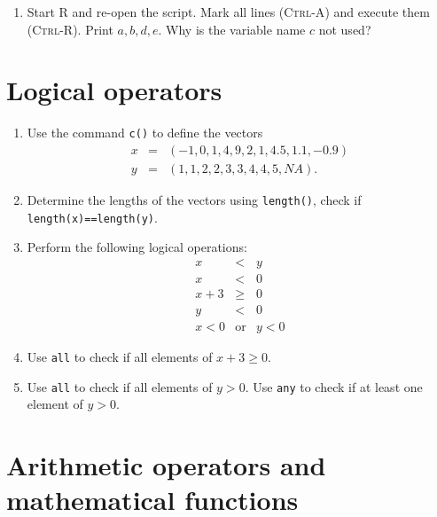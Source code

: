 \documentclass{article}
\begin{document}
\begin{enumerate}
\item Start R and re-open the script. Mark all lines (\textsc{Ctrl-A}) and
execute them (\textsc{Ctrl-R}). Print $a,b,d,e.$ Why is the variable name $c$
not used?

\end{enumerate}
\newpage


\section{Logical operators}

\begin{enumerate}
\item Use the command \texttt{c()} to define the vectors%
\begin{eqnarray*}
x &=&\left( -1,0,1,4,9,2,1,4.5,1.1,-0.9\right) \\
y &=&\left( 1,1,2,2,3,3,4,4,5,NA\right) .
\end{eqnarray*}

\item Determine the lengths of the vectors using \texttt{length()}, check if 
\texttt{length(x)==length(y)}.

\item Perform the following logical operations:%
\begin{align*}
x &<&y \\
x &<&0 \\
x+3 &\geq &0 \\
y &<&0 \\
x<0 &\text{or}&y<0
\end{align*}

\item Use \texttt{all} to check if all elements of $x+3\geq 0.$

\item Use \texttt{all} to check if all elements of $y>0.$ Use \texttt{any}
to check if at least one element of $y>0.$
\end{enumerate}
\newpage

\section{Arithmetic operators and mathematical functions}
\end{document}
